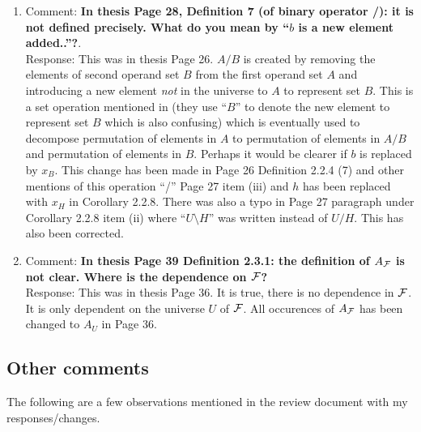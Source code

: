 \documentclass{article}
\begin{document}
\begin{enumerate}
\item Comment: {\bf In thesis Page 28, Definition 7 (of binary
    operator /): it is not defined precisely. What do you mean by
    ``$b$ is a new element added..''?}.\\
  Response: This was in thesis Page 26. $A/B$ is created by removing
  the elements of second operand set $B$ from the first operand set
  $A$ and introducing a new element {\em not} in the universe to $A$
  to represent set $B$. This is a set operation mentioned in
  \cite{mm96} (they use ``$B$'' to denote the new element to represent
  set $B$ which is also confusing) which is eventually used to
  decompose permutation of elements in $A$ to permutation of elements
  in $A/B$ and permutation of elements in $B$.  Perhaps it would be
  clearer if $b$ is replaced by $x_B$. This change has been made in
  Page 26 Definition 2.2.4 (7) and other mentions of this operation
  ``/'' Page 27 item (iii) and $h$ has been replaced with $x_H$ in
  Corollary 2.2.8. There was also a typo in Page 27 paragraph under
  Corollary 2.2.8 item (ii) where ``$U \setminus H$'' was written
  instead of $U / H$.  This has also been corrected.

\item Comment: {\bf In thesis Page 39 Definition 2.3.1: the definition
    of $A_{\cal F}$ is not clear. Where is the dependence on ${\cal F}$?}\\
  Response: This was in thesis Page 36. It is true, there is no
  dependence in ${\cal F}$. It is only dependent on the universe $U$ of
  ${\cal F}$. All occurences of $A_{\cal F}$ has been changed to $A_U$ in Page
  36.
\end{enumerate}


\subsection{Other comments}
The following are a few observations mentioned in the review document
with my responses/changes.
\end{document}
